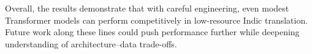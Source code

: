\documentclass[11pt, oneside]{article}   	%
\begin{document}
Overall, the results demonstrate that with careful engineering, even modest Transformer models can perform competitively in low-resource Indic translation. Future work along these lines could push performance further while deepening understanding of architecture–data trade-offs.


 

\end{document}
